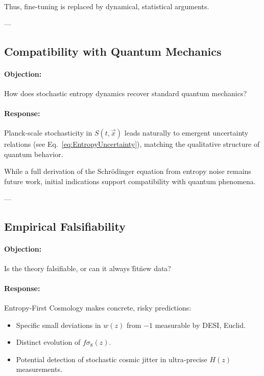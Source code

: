\documentclass{article}
\begin{document}
Thus, fine-tuning is replaced by dynamical, statistical arguments.

---

\subsection{Compatibility with Quantum Mechanics}

\paragraph{Objection:}  
How does stochastic entropy dynamics recover standard quantum mechanics?

\paragraph{Response:}
Planck-scale stochasticity in $S(t, \vec{x})$ leads naturally to emergent uncertainty relations (see Eq.~\eqref{eq:EntropyUncertainty}), matching the qualitative structure of quantum behavior.

While a full derivation of the Schr\"odinger equation from entropy noise remains future work, initial indications support compatibility with quantum phenomena.

---

\subsection{Empirical Falsifiability}

\paragraph{Objection:}  
Is the theory falsifiable, or can it always \"fit\" new data?

\paragraph{Response:}
Entropy-First Cosmology makes concrete, risky predictions:
\begin{itemize}
    \item Specific small deviations in $w(z)$ from $-1$ measurable by DESI, Euclid.
    \item Distinct evolution of $f\sigma_8(z)$.
    \item Potential detection of stochastic cosmic jitter in ultra-precise $H(z)$ measurements.
\end{itemize}
\end{document}
